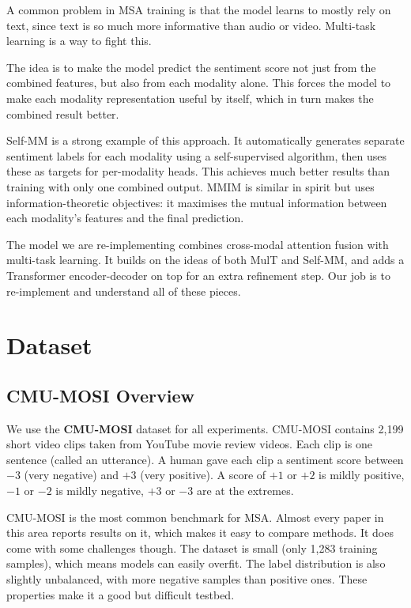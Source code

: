 \documentclass[11pt,twocolumn]{article}
\begin{document}
A common problem in MSA training is that the model learns to mostly rely on text, since text is so much more informative than audio or video. Multi-task learning is a way to fight this.

The idea is to make the model predict the sentiment score not just from the combined features, but also from each modality alone. This forces the model to make each modality representation useful by itself, which in turn makes the combined result better.

Self-MM \citep{yu2021selfmm} is a strong example of this approach. It automatically generates separate sentiment labels for each modality using a self-supervised algorithm, then uses these as targets for per-modality heads. This achieves much better results than training with only one combined output. MMIM \citep{han2021improving} is similar in spirit but uses information-theoretic objectives: it maximises the mutual information between each modality's features and the final prediction.

The model we are re-implementing \citep{cai2025multimodal} combines cross-modal attention fusion with multi-task learning. It builds on the ideas of both MulT and Self-MM, and adds a Transformer encoder-decoder on top for an extra refinement step. Our job is to re-implement and understand all of these pieces.

\section{Dataset}
\label{sec:dataset}

\subsection{CMU-MOSI Overview}

We use the \textbf{CMU-MOSI} dataset \citep{zadeh2016multimodal} for all experiments. CMU-MOSI contains 2,199 short video clips taken from YouTube movie review videos. Each clip is one sentence (called an utterance). A human gave each clip a sentiment score between $-3$ (very negative) and $+3$ (very positive). A score of $+1$ or $+2$ is mildly positive, $-1$ or $-2$ is mildly negative, $+3$ or $-3$ are at the extremes.

CMU-MOSI is the most common benchmark for MSA. Almost every paper in this area reports results on it, which makes it easy to compare methods. It does come with some challenges though. The dataset is small (only 1,283 training samples), which means models can easily overfit. The label distribution is also slightly unbalanced, with more negative samples than positive ones. These properties make it a good but difficult testbed.
\end{document}

